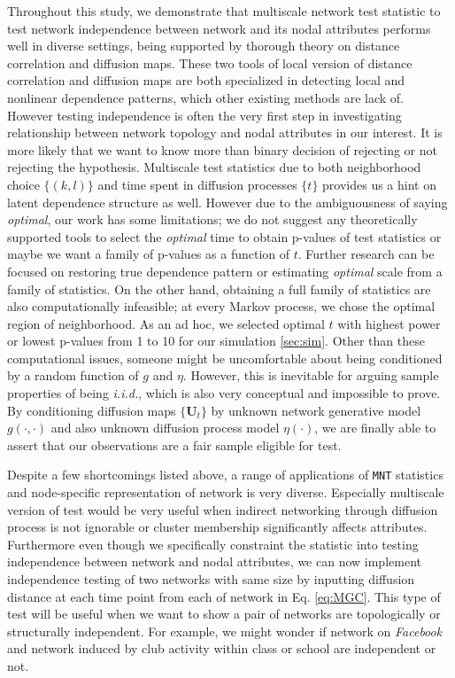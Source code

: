 \documentclass[12pt]{article}
\theoremstyle{definition}
\begin{document}
Throughout this study, we demonstrate that multiscale network test statistic to test network independence between network and its nodal attributes performs well in diverse settings, being supported by thorough theory on distance correlation and diffusion maps. These two tools of local version of distance correlation and diffusion maps are both specialized in detecting local and nonlinear dependence patterns, which other existing methods are lack of. However testing independence is often the very first step in investigating relationship between network topology and nodal attributes in our interest. It is more likely that we want to know more than binary decision of rejecting or not rejecting the hypothesis. Multiscale test statistics due to both neighborhood choice $\{ (k,l)  \}$ and time spent in diffusion processes $\{ t \}$ provides us a hint on latent dependence structure as well.  However due to the ambiguousness of saying \textit{optimal}, our work has some limitations; we do not suggest any theoretically supported tools to select the \textit{optimal} time to obtain p-values of test statistics or maybe we want a family of p-values as a function of $t$. Further research can be focused on restoring true dependence pattern or estimating \textit{optimal} scale from a family of statistics. On the other hand, obtaining a full family of statistics are also computationally infeasible; at every Markov process, we chose the optimal region of neighborhood. As an ad hoc, we selected optimal $t$ with highest power or lowest p-values from 1 to 10 for our simulation \ref{sec:sim}.  Other than these computational issues, someone might be uncomfortable about being conditioned by a random function of $g$ and $\eta$.  However, this is inevitable for arguing sample properties of being \textit{i.i.d.}, which is also very conceptual and impossible to prove. By conditioning diffusion maps $\{ \mathbf{U}_{t} \}$ by unknown network generative model $g(\cdot, \cdot)$ and also unknown diffusion process model $\eta(\cdot)$, we are finally able to assert that our observations are a fair sample eligible for test. 
	
Despite a few shortcomings listed above, a range of applications of \texttt{MNT} statistics and node-specific representation of network is very diverse. Especially multiscale version of test would be very useful when indirect networking through diffusion process is not ignorable or cluster membership significantly affects attributes. Furthermore even though we specifically constraint the statistic into testing independence between network and nodal attributes, we can now implement independence testing of two networks with same size by inputting diffusion distance at each time point from each of network in Eq. \ref{eq:MGC}. This type of test will be useful when we want to show a pair of networks are topologically or structurally independent. For example, we might wonder if network on \textit{Facebook} and network induced by club activity within class or school are independent or not. 
 
\end{document}

